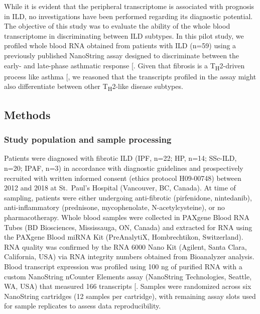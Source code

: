 \documentclass[
]{article}
\begin{document}
While it is evident that the peripheral transcriptome is associated with prognosis in ILD, no investigations have been performed regarding its diagnostic potential. The objective of this study was to evaluate the ability of the whole blood transcriptome in discriminating between ILD subtypes. In this pilot study, we profiled whole blood RNA obtained from patients with ILD (n=59) using a previously published NanoString assay designed to discriminate between the early- and late-phase asthmatic response {[}\citeproc{ref-singh_novel_2018}{103}{]}. Given that fibrosis is a T\textsubscript{H}2-driven process like asthma {[}\citeproc{ref-spagnolo_role_2022}{104}{]}, we reasoned that the transcripts profiled in the assay might also differentiate between other T\textsubscript{H}2-like disease subtypes.

\subsection{Methods}\label{methods-1}

\subsubsection{Study population and sample processing}\label{study-population-and-sample-processing}

Patients were diagnosed with fibrotic ILD (IPF, n=22; HP, n=14; SSc-ILD, n=20; IPAF, n=3) in accordance with diagnostic guidelines and prospectively recruited with written informed consent (ethics protocol H09-00748) between 2012 and 2018 at St.~Paul's Hospital (Vancouver, BC, Canada). At time of sampling, patients were either undergoing anti-fibrotic (pirfenidone, nintedanib), anti-inflammatory (prednisone, mycophenolate, N-acetylcysteine), or no pharmacotherapy. Whole blood samples were collected in PAXgene Blood RNA Tubes (BD Biosciences, Mississauga, ON, Canada) and extracted for RNA using the PAXgene Blood miRNA Kit (PreAnalytiX, Hombrechtikon, Switzerland). RNA quality was confirmed by the RNA 6000 Nano Kit (Agilent, Santa Clara, California, USA) via RNA integrity numbers obtained from Bioanalyzer analysis. Blood transcript expression was profiled using 100 ng of purified RNA with a custom NanoString nCounter Elements assay (NanoString Technologies, Seattle, WA, USA) that measured 166 transcripts {[}\citeproc{ref-singh_novel_2018}{103}{]}. Samples were randomized across six NanoString cartridges (12 samples per cartridge), with remaining assay slots used for sample replicates to assess data reproducibility.
\end{document}
